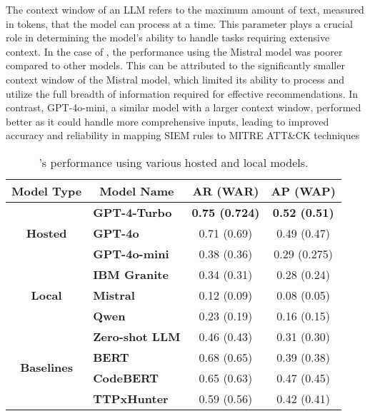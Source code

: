 The context window of an LLM refers to the maximum amount of text, measured in tokens, that the model can process at a time. 
This parameter plays a crucial role in determining the model's ability to handle tasks requiring extensive context.
In the case of \methodName, the performance using the Mistral model was poorer compared to other models. 
This can be attributed to the significantly smaller context window of the Mistral model, which limited its ability to process and utilize the full breadth of information required for effective recommendations.
In contrast, GPT-4o-mini, a similar model with a larger context window, performed better as it could handle more comprehensive inputs, leading to improved accuracy and reliability in mapping SIEM rules to MITRE ATT\&CK techniques



\begin{table}[h]
\centering
\caption{\methodName's performance using various hosted and local models.}
\begin{tabular}{|c|l|c|c|}
\hline
\textbf{Model Type}              & \multicolumn{1}{c|}{\textbf{Model Name}} & \textbf{AR (WAR)} & \textbf{AP (WAP)} \\ \hline
\multirow{3}{*}{\textbf{Hosted}} & \textbf{GPT-4-Turbo}                     & \textbf{0.75 (0.724)}           & \textbf{0.52 (0.51)}                \\ \cline{2-4} 
       & \textbf{GPT-4o}                          & 0.71 (0.69)                  & 0.49 (0.47)                         \\ \cline{2-4} 
         & \textbf{GPT-4o-mini}                     & 0.38 (0.36)                    & 0.29 (0.275)                        \\ \hline
\multirow{3}{*}{\textbf{Local}}  & \textbf{IBM Granite}                     & 0.34 (0.31)                    & 0.28 (0.24)                         \\ \cline{2-4} 
       & \textbf{Mistral}                         & 0.12 (0.09)                   & 0.08 (0.05)                        \\ \cline{2-4} 
    & \textbf{Qwen}                            & 0.23 (0.19)                    & 0.16 (0.15)                        \\ \hline\hline

\multirow{4}{*}{\textbf{Baselines}} & \textbf{Zero-shot LLM}                     & 0.46 (0.43)           & 0.31 (0.30)                \\ \cline{2-4} 
       & \textbf{BERT}                          &  0.68 (0.65)                   &    0.39 (0.38)                     \\ \cline{2-4} 
        & \textbf{CodeBERT}                  &  0.65 (0.63)                   &  0.47 (0.45)                      \\ \cline{2-4}
        & \textbf{TTPxHunter}~\cite{rani2024ttpxhunter}                     & 0.59 (0.56)                    & 0.42 (0.41)                        \\ \hline
\end{tabular}
\label{tab:Results2}
\end{table}


